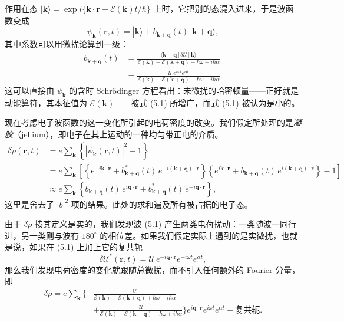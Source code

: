 作用在态 $|\mathbf{k}\rangle=\exp i\{\mathbf{k}\cdot\mathbf{r}+\mathcal{E}(\mathbf{k})t/\hbar\}$ 上时，它把别的态混入进来，于是波函数变成
\begin{equation*}
\psi_{\mathbf{k}}(\mathbf{r},t)=|\mathbf{k}\rangle+b_{\mathbf{k}+\mathbf{q}}(t)\,|\mathbf{k}+\mathbf{q}\rangle,
\tag{5.2}
\end{equation*}
其中系数可以用微扰论算到一级：
\begin{align*}
b_{\mathbf{k}+\mathbf{q}}(t)&=\frac{\langle\mathbf{k}+\mathbf{q}\,|\,\delta\mathcal{U}\,|\,\mathbf{k}\rangle}{\mathcal{E}(\mathbf{k})-\mathcal{E}(\mathbf{k}+\mathbf{q})+\hbar\omega-i\hbar\alpha}\\
&=\frac{\mathcal{U}\,e^{i\omega t}e^{\alpha t}}{\mathcal{E}(\mathbf{k})-\mathcal{E}(\mathbf{k}+\mathbf{q})+\hbar\omega-i\hbar\alpha}.
\tag{5.3}
\end{align*}
这可以直接由 $\psi_{\mathbf{k}}$ 的含时 Schrödinger 方程看出：未微扰的哈密顿量——正好就是动能算符，其本征值为 $\mathcal{E}(\mathbf{k})$——被式 (5.1) 所增广，而式 (5.1) 被认为是小的。

现在考虑电子波函数的这一变化所引起的电荷密度的改变。我们假定所处理的是\emph{凝胶}（jellium），即电子在其上运动的一种均匀带正电的介质。
\begin{align*}
\delta\rho(\mathbf{r},t)&=e\sum_{\mathbf{k}}\left\{\left|\psi_{\mathbf{k}}(\mathbf{r},t)\right|^{2}-1\right\}\\
&=e\sum_{\mathbf{k}}\left[\left\{e^{-i\mathbf{k}\cdot\mathbf{r}}+b_{\mathbf{k}+\mathbf{q}}^{*}(t)\,e^{-i(\mathbf{k}+\mathbf{q})\cdot\mathbf{r}}\right\}\left\{e^{i\mathbf{k}\cdot\mathbf{r}}+b_{\mathbf{k}+\mathbf{q}}(t)\,e^{i(\mathbf{k}+\mathbf{q})\cdot\mathbf{r}}\right\}-1\right]\\
&\approx e\sum_{\mathbf{k}}\left\{b_{\mathbf{k}+\mathbf{q}}(t)\,e^{i\mathbf{q}\cdot\mathbf{r}}+b_{\mathbf{k}+\mathbf{q}}^{*}(t)\,e^{-i\mathbf{q}\cdot\mathbf{r}}\right\},
\tag{5.4}
\end{align*}
这里是舍去了 $|b|^{2}$ 项的结果。此处的求和遍及所有被占据的电子态。

由于 $\delta\rho$ 按其定义是实的，我们发现波 (5.1) 产生两类电荷扰动：一类随波一同行进，另一类则与波有 $180^{\circ}$ 的相位差。如果我们假定实际上遇到的是实微扰，也就是说，如果在 (5.1) 上加上它的复共轭
\begin{equation*}
\delta\mathcal{U}^{*}(\mathbf{r},t)=\mathcal{U}\,e^{-i\mathbf{q}\cdot\mathbf{r}}e^{-i\omega t}e^{\alpha t},
\tag{5.5}
\end{equation*}
那么我们发现电荷密度的变化就跟随总微扰，而不引入任何额外的 Fourier 分量，即
\begin{align*}
\delta\rho=e\sum_{\mathbf{k}}\bigg\{&\frac{\mathcal{U}}{\mathcal{E}(\mathbf{k})-\mathcal{E}(\mathbf{k}+\mathbf{q})+\hbar\omega-i\hbar\alpha}\\
&+\frac{\mathcal{U}}{\mathcal{E}(\mathbf{k})-\mathcal{E}(\mathbf{k}-\mathbf{q})-\hbar\omega+i\hbar\alpha}\bigg\}e^{i\mathbf{q}\cdot\mathbf{r}}e^{i\omega t}e^{\alpha t}+\text{复共轭}.
\tag{5.6}
\end{align*}

